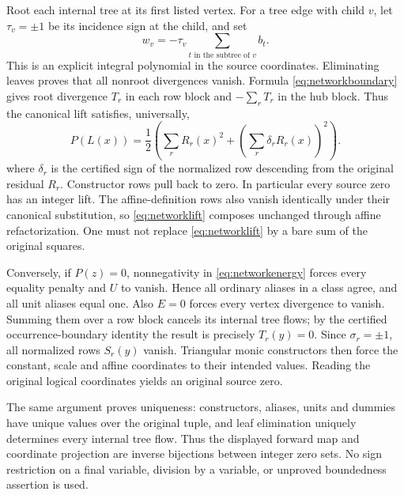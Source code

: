 Root each internal tree at its first listed vertex. For a tree edge with
child $v$, let $\tau_v=\pm1$ be its incidence sign at the child, and set
\[
 w_v=-\tau_v\sum_{t\text{ in the subtree of }v}b_t.
\]
This is an explicit integral polynomial in the source coordinates.
Eliminating leaves proves that all nonroot divergences vanish. Formula
\eqref{eq:networkboundary} gives root divergence $T_r$ in each row block and $-\sum_rT_r$ in the
hub block. Thus the canonical lift satisfies, universally,
\begin{equation}\label{eq:networklift}
 P(L(x))=\frac12\left(\sum_rR_r(x)^2+
                \left(\sum_r\delta_rR_r(x)\right)^2\right).
\end{equation}
where $\delta_r$ is the certified sign of the normalized row descending
from the original residual $R_r$. Constructor rows pull back to zero.
In particular every source zero has an integer lift. The affine-definition
rows also vanish identically under their canonical substitution, so \eqref{eq:networklift}
composes unchanged through affine refactorization. One must not replace
\eqref{eq:networklift} by a bare sum of the original squares.

Conversely, if $P(z)=0$, nonnegativity in \eqref{eq:networkenergy} forces every equality
penalty and $U$ to vanish. Hence all ordinary aliases in a class agree,
and all unit aliases equal one. Also $E=0$ forces every vertex divergence
to vanish. Summing them over a row block cancels its internal tree flows;
by the certified occurrence-boundary identity the result is precisely
$T_r(y)=0$. Since $\sigma_r=\pm1$, all normalized rows $S_r(y)$ vanish.
Triangular monic constructors then force the constant, scale and affine
coordinates to their intended values. Reading the original logical
coordinates yields an original source zero.

The same argument proves uniqueness: constructors, aliases, units and
dummies have unique values over the original tuple, and leaf elimination
uniquely determines every internal tree flow. Thus the displayed forward
map and coordinate projection are inverse bijections between integer zero
sets. No sign restriction on a final variable, division by a variable,
or unproved boundedness assertion is used.


